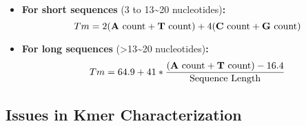 \documentclass[
  letterpaper,
]{article}
\providecommand{\tightlist}{%
  \setlength{\itemsep}{0pt}\setlength{\parskip}{0pt}}\usepackage{longtable,booktabs,array}
\begin{document}
\begin{itemize}
\tightlist
\item
  \textbf{For short sequences} (3 to 13\textasciitilde20
  nucleotides)\textbf{:} \small\begin{equation}
  Tm=2(\text{\textbf{A} count} + \text{\textbf{T} count}) + 4(\text{\textbf{C} count} + \text{\textbf{G} count})
  \end{equation}\normalsize \vspace{0.04cm}
\item
  \textbf{For long sequences} (\textgreater13\textasciitilde20
  nucleotides)\textbf{:} \small\begin{equation}
  Tm=64.9 + 41 * \frac{(\text{\textbf{A} count} + \text{\textbf{T} count}) - 16.4}{\text{Sequence Length}}
  \end{equation}\normalsize \vspace{0.04cm}
\end{itemize}

\subsection{Issues in Kmer
Characterization}\label{issues-in-kmer-characterization}
\end{document}

